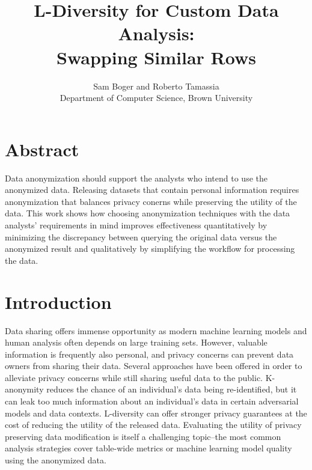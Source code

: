 

\date{}

\title{\Large \bf L-Diversity for Custom Data Analysis:\\
  Swapping Similar Rows}

\author{
{\rm Sam Boger and Roberto Tamassia} \\
Department of Computer Science, Brown University

} %

\maketitle
\section*{Abstract}
Data anonymization should support the analysts who intend to use the anonymized data. Releasing datasets that contain personal information requires anonymization that balances privacy conerns while preserving the utility of the data. This work shows how choosing anonymization techniques with the data analysts' requirements in mind improves effectiveness quantitatively by minimizing the discrepancy between querying the original data versus the anonymized result and qualitatively by simplifying the workflow for processing the data.

\section{Introduction}
Data sharing offers immense opportunity as modern machine learning models and human analysis often depends on large training sets. However, valuable information is frequently also personal, and privacy concerns can prevent data owners from sharing their data. Several approaches have been offered in order to alleviate privacy concerns while still sharing useful data to the public. K-anonymity reduces the chance of an individual’s data being re-identified, but it can leak too much information about an individual's data in certain adversarial models and data contexts. L-diversity can offer stronger privacy guarantees at the cost of reducing the utility of the released data. Evaluating the utility of privacy preserving data modification is itself a challenging topic--the most common analysis strategies cover table-wide metrics or machine learning model quality using the anonymized data.

